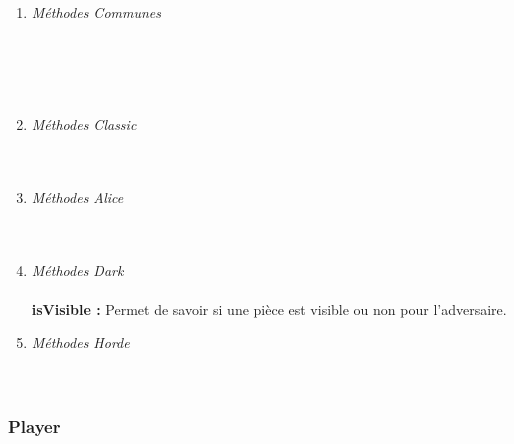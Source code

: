 \documentclass[10pt, a4paper]{article}
\begin{document}
\begin{enumerate}

\item \textit{Méthodes Communes} \\
\textbf{}  \\
\textbf{}  \\
\textbf{}  \\
\textbf{}  \\

\item \textit{Méthodes Classic } \\
\textbf{}  \\
\textbf{}  \\

\item \textit{Méthodes Alice} \\
\textbf{}  \\
\textbf{}  \\

\item \textit{Méthodes Dark} \\ \\
\textbf{isVisible :} Permet de savoir si une pièce est visible ou non pour l'adversaire. \\

\item \textit{Méthodes Horde} \\
\textbf{}  \\
\textbf{}  \\
\end{enumerate}
\subsubsection{Player}
\end{document}
